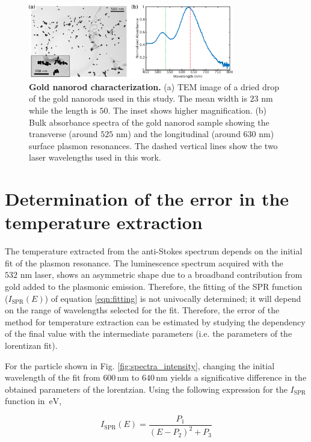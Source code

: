 \documentclass[journal=nalefd,manuscript=letter]{achemso}
\newcommand{\nm}{\ensuremath{\,\textrm{nm}}}
\newcommand{\eV}{\ensuremath{\,\textrm{eV}}}
\begin{document}
\begin{figure}[htp] \centering
\includegraphics[width=0.8\textwidth]{Figures/Supplementary/07_GNRs_Characterization_TEM/GNRs_characterization.png}
\caption{\textbf{Gold nanorod characterization.} (a) TEM image of a dried drop of  the gold nanorods used in this study. The mean width is $23$ nm while the length is $50$. The inset shows higher magnification. (b) Bulk absorbance spectra of the gold nanorod sample showing the transverse (around $525$ nm) and the longitudinal (around $630$ nm) surface plasmon resonances. The dashed vertical lines show the two laser wavelengths used in this work.}
	\label{fg:nr-char}
\end{figure}


\section{Determination of the error in the temperature extraction}\label{sec:discussion_errors} 

The temperature extracted from the anti-Stokes spectrum depends on the initial fit of the plasmon resonance. The luminescence spectrum acquired with the $532\,\nm$ laser, shows an asymmetric shape due to a broadband contribution from gold added to the plasmonic emission. Therefore, the fitting of the SPR function ($I_\textrm{SPR}(E)$) of equation \ref{eqn:fitting} is not univocally determined; it will depend on the range of wavelengths selected for the fit. Therefore, the error of the method for temperature extraction can be estimated by studying the dependency of the final value with the intermediate parameters (i.e. the parameters of the lorentizan fit).

For the particle shown in Fig. \ref{fig:spectra_intensity}, changing the initial wavelength of the fit from $600\nm$ to $640\nm$ yields a significative difference in the obtained parameters of the lorentzian. Using the following expression for the $I_\textrm{SPR}$ function in $\eV$, 

\begin{equation*}
I_\textrm{SPR}(E) = \frac{P_1}{(E-P_2)^2+P_3}
\end{equation*}
\end{document}
